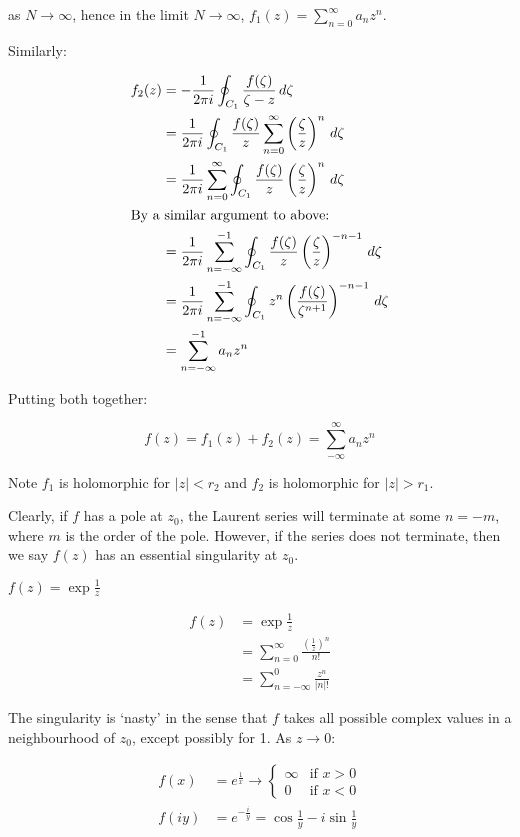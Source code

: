 \documentclass{../../physics_notes}
\begin{document}
as $N\to \infty$, hence in the limit $N\to\infty$, $f_1(z) = \sum_{n=0}^\infty a_n z^n$.

Similarly:

\begin{align*}
f_2 (z) &= -\frac{1}{2\pi i} \oint_{C_1} \frac{f(\zeta)}{\zeta - z} \, d\zeta \\
&= \frac{1}{2\pi i} \oint_{C_1} \frac{f(\zeta)}{z} \sum_{n=0}^\infty \left(\frac{\zeta}{z}\right)^n \, d\zeta \\
&= \frac{1}{2\pi i} \sum_{n=0}^\infty \oint_{C_1} \frac{f(\zeta)}{z} \left(\frac{\zeta}{z}\right)^n \, d\zeta \\
\intertext{By a similar argument to above:}
&= \frac{1}{2\pi i} \sum_{n=-\infty}^{-1} \oint_{C_1} \frac{f(\zeta)}{z} \left(\frac{\zeta}{z}\right)^{-n-1} \, d\zeta \\
&= \frac{1}{2\pi i} \sum_{n=-\infty}^{-1} \oint_{C_1} z^n \left(\frac{f(\zeta)}{\zeta^{n+1}}\right)^{-n-1} \, d\zeta \\
&= \sum_{n=-\infty}^{-1} a_n z^n
\end{align*}

Putting both together:

\[ f(z) = f_1 (z) + f_2 (z) = \sum_{-\infty}^{\infty} a_n z^n \]

Note $f_1$ is holomorphic for $|z| < r_2$ and $f_2$ is holomorphic for $|z|>r_1$.

Clearly, if $f$ has a pole at $z_0$, the Laurent series will terminate at some $n = -m$, where $m$ is the order of the pole. However, if the series does not terminate, then we say $f(z)$ has an essential singularity at $z_0$.

\begin{example}{$f(z) = \exp{\frac{1}{z}}$}

\begin{align*}
f(z) &= \exp{\frac{1}{z}} \\
&= \sum_{n=0}^\infty \frac{\left(\frac{1}{z}\right)^n}{n!} \\
&= \sum_{n=-\infty}^0 \frac{z^n}{|n|!}
\end{align*}

The singularity is `nasty' in the sense that $f$ takes all possible complex values in a neighbourhood of $z_0$, except possibly for 1. As $z\to 0$:

\begin{align*}
f(x) &= e^{\frac{1}{x}} \to \begin{cases} \infty & \mbox{if } x>0 \\
0 & \mbox{if } x<0 \end{cases} \\
f(iy) &= e^{-\frac{i}{y}} = \cos{\frac{1}{y}} - i\sin{\frac{1}{y}}
\end{align*}
\end{example}
\end{document}
